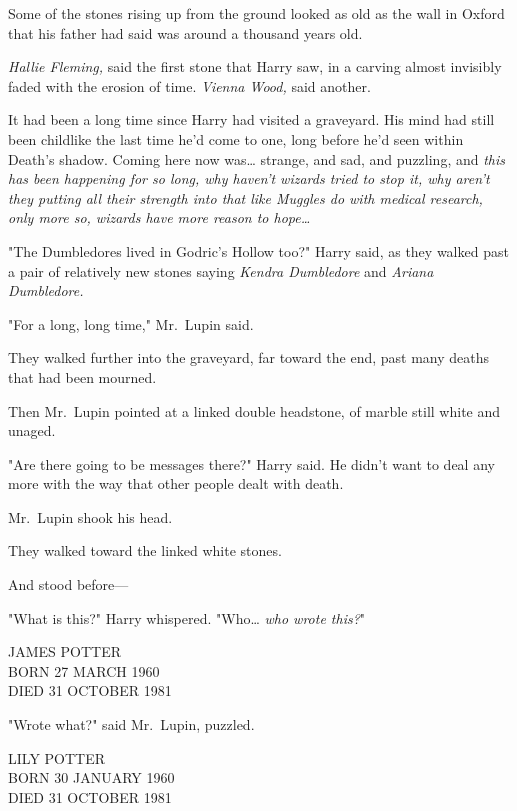 Some of the stones rising up from the ground looked as old as the wall in 
Oxford that his father had said was around a thousand years old.

\emph{Hallie Fleming,} said the first stone that Harry saw, in a carving almost 
invisibly faded with the erosion of time. \emph{Vienna Wood,} said another.

It had been a long time since Harry had visited a graveyard. His mind had still 
been childlike the last time he'd come to one, long before he'd seen within 
Death's shadow. Coming here now was{\ldots} strange, and sad, and puzzling, and 
\emph{this has been happening for so long, why haven't wizards tried to stop 
it, why aren't they putting all their strength into that like Muggles do with 
medical research, only more so, wizards have more reason to hope{\ldots}}

"The Dumbledores lived in Godric's Hollow too?" Harry said, as they walked past 
a pair of relatively new stones saying \emph{Kendra Dumbledore} and 
\emph{Ariana Dumbledore.}

"For a long, long time," Mr.~Lupin said.

They walked further into the graveyard, far toward the end, past many deaths 
that had been mourned.

Then Mr.~Lupin pointed at a linked double headstone, of marble still white and 
unaged.

"Are there going to be messages there?" Harry said. He didn't want to deal any 
more with the way that other people dealt with death.

Mr.~Lupin shook his head.

They walked toward the linked white stones.

And stood before---

"What is this?" Harry whispered. "Who{\ldots} \emph{who wrote this?}"

\begin{center}
JAMES POTTER\\
BORN 27 MARCH 1960\\
DIED 31 OCTOBER 1981
\end{center}

"Wrote what?" said Mr.~Lupin, puzzled.

\begin{center}
LILY POTTER\\
BORN 30 JANUARY 1960\\
DIED 31 OCTOBER 1981
\end{center}

